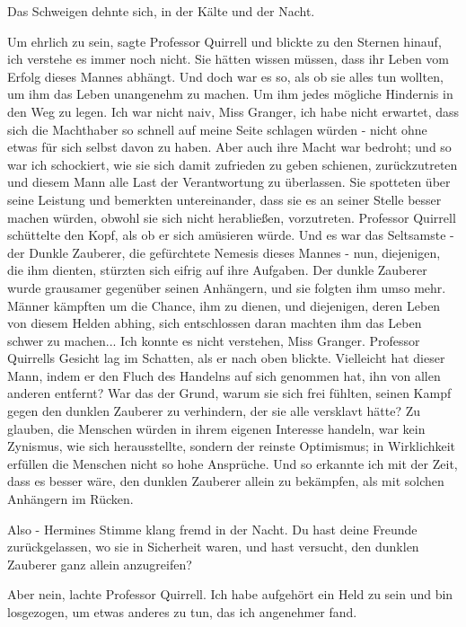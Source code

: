 Das Schweigen dehnte sich, in der Kälte und der Nacht.

\glqq Um ehrlich zu sein\grqq{}, sagte Professor Quirrell und blickte zu den
Sternen hinauf, \glqq ich verstehe es immer noch nicht. Sie hätten wissen
müssen, dass ihr Leben vom Erfolg dieses Mannes abhängt. Und doch war es so, als
ob sie alles tun wollten, um ihm das Leben unangenehm zu machen. Um ihm jedes
mögliche Hindernis in den Weg zu legen. Ich war nicht naiv, Miss Granger, ich
habe nicht erwartet, dass sich die Machthaber so schnell auf meine Seite
schlagen würden - nicht ohne etwas für sich selbst davon zu haben. Aber auch
ihre Macht war bedroht; und so war ich schockiert, wie sie sich damit zufrieden
zu geben schienen, zurückzutreten und diesem Mann alle Last der Verantwortung zu
überlassen. Sie spotteten über seine Leistung und bemerkten untereinander, dass
sie es an seiner Stelle besser machen würden, obwohl sie sich nicht herabließen,
vorzutreten.\grqq{} Professor Quirrell schüttelte den Kopf, als ob er sich
amüsieren würde. \glqq Und es war das Seltsamste - der Dunkle Zauberer, die
gefürchtete Nemesis dieses Mannes - nun, diejenigen, die ihm dienten, stürzten
sich eifrig auf ihre Aufgaben. Der dunkle Zauberer wurde grausamer gegenüber
seinen Anhängern, und sie folgten ihm umso mehr. Männer kämpften um die Chance,
ihm zu dienen, und diejenigen, deren Leben von diesem Helden abhing, sich
entschlossen daran machten ihm das Leben schwer zu machen... Ich konnte es nicht
verstehen, Miss Granger.\grqq{} Professor Quirrells Gesicht lag im Schatten, als
er nach oben blickte. \glqq Vielleicht hat dieser Mann, indem er den Fluch des
Handelns auf sich genommen hat, ihn von allen anderen entfernt? War das der
Grund, warum sie sich frei fühlten, seinen Kampf gegen den dunklen Zauberer zu
verhindern, der sie alle versklavt hätte? Zu glauben, die Menschen würden in
ihrem eigenen Interesse handeln, war kein Zynismus, wie sich herausstellte,
sondern der reinste Optimismus; in Wirklichkeit erfüllen die Menschen nicht so
hohe Ansprüche. Und so erkannte ich mit der Zeit, dass es besser wäre, den
dunklen Zauberer allein zu bekämpfen, als mit solchen Anhängern im
Rücken.\grqq{}

\glqq Also -\grqq{} Hermines Stimme klang fremd in der Nacht. \glqq Du hast
deine Freunde zurückgelassen, wo sie in Sicherheit waren, und hast versucht, den
dunklen Zauberer ganz allein anzugreifen?\grqq{}

\glqq Aber nein\grqq{}, lachte Professor Quirrell. \glqq Ich habe aufgehört ein
Held zu sein und bin losgezogen, um etwas anderes zu tun, das ich angenehmer
fand.\grqq{}

